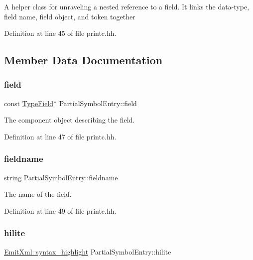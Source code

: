 A helper class for unraveling a nested reference to a field. It links the data-\/type, field name, field object, and token together 

Definition at line 45 of file printc.\+hh.



\subsection{Member Data Documentation}
\mbox{\label{struct_partial_symbol_entry_ab70c112a5a6a83784896b1834f9398f4}} 
\subsubsection{\texorpdfstring{field}{field}}
{\footnotesize\ttfamily const \mbox{\hyperlink{struct_type_field}{Type\+Field}}$\ast$ Partial\+Symbol\+Entry\+::field}



The component object describing the field. 



Definition at line 47 of file printc.\+hh.

\mbox{\label{struct_partial_symbol_entry_a10cb26ea8e9f2c70ab883e1094fd6a32}} 
\subsubsection{\texorpdfstring{fieldname}{fieldname}}
{\footnotesize\ttfamily string Partial\+Symbol\+Entry\+::fieldname}



The name of the field. 



Definition at line 49 of file printc.\+hh.

\mbox{\label{struct_partial_symbol_entry_a6ae42a52fe2ac08f4d25c357881f2a7f}} 
\subsubsection{\texorpdfstring{hilite}{hilite}}
{\footnotesize\ttfamily \mbox{\hyperlink{class_emit_xml_a7c3577436da429c3c75f4b82cac6864f}{Emit\+Xml\+::syntax\+\_\+highlight}} Partial\+Symbol\+Entry\+::hilite}



